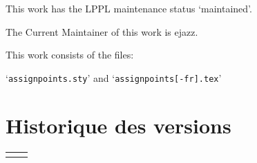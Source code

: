\documentclass[
  twocolumn,%
  fontsize=9pt,%
  DIV=calc,%
  numbers=noendperiod%
]{scrartcl}
\makeatletter
\newcommand*\assignpointsprinttabletokens{\the\@tabtoks}
\newlength{\revision}
\newcommand{\showcaserevisions}{%
	\begin{tabular}{@{}l@{~}p{\linewidth-\revision}@{}}
		\assignpointsprinttabletokens    
	\end{tabular}%
}
\makeatother
\begin{document}
This work has the LPPL maintenance status `maintained'.\smallskip

The Current Maintainer of this work is ejazz.\smallskip

This work consists of the files:\newline\hspace{2pt} %
\centerline{`\texttt{assignpoints.sty}' and `\texttt{assignpoints[-fr].tex}'}

\vfill



\section{Historique des versions}
\label{sec:8}

\showcaserevisions

\end{document}
